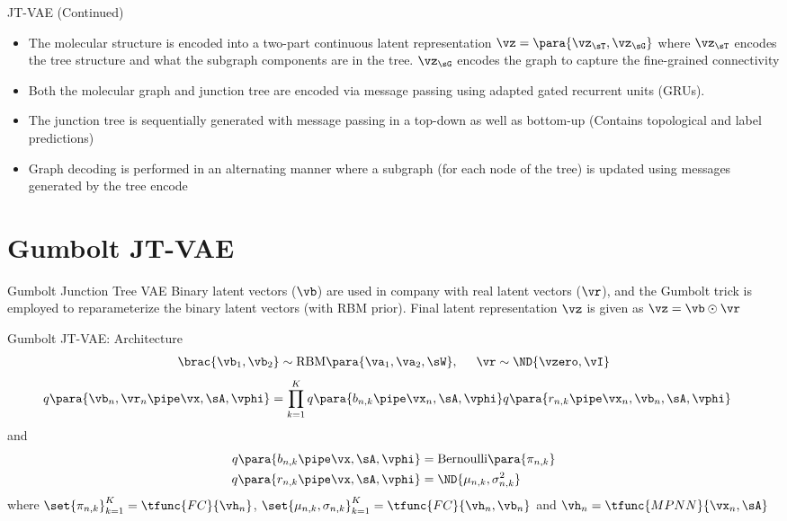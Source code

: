 \documentclass[9pt]{beamer}
\newcommand{\qp}{q\para}
\begin{document}
\begin{frame}{JT-VAE (Continued)}
	\begin{itemize}
		\item <1-> The molecular structure is encoded into a two-part continuous latent representation $\vz = \para{\vz_\sT, \vz_\sG}$ where $\vz_\sT$ encodes the tree structure and what the subgraph components are in the tree. $\vz_\sG$ encodes the graph to capture the fine-grained connectivity
		\item <2-> Both the molecular graph and junction tree are encoded via message passing using adapted gated recurrent units (GRUs).
		\item <3-> The junction tree is sequentially generated with message passing in a top-down as well as bottom-up (Contains topological and label predictions)
		\item <4-> Graph decoding is performed in an alternating manner where a subgraph (for each node of the tree) is updated using messages generated by the tree encode
	\end{itemize}
\end{frame}

\section{Gumbolt JT-VAE}
\begin{frame}{Gumbolt Junction Tree VAE}
	Binary latent vectors ($\vb$) are used in company with real latent vectors ($\vr$), and the Gumbolt trick is employed to reparameterize the binary latent vectors (with RBM prior). Final latent representation $\vz$ is given as $\vz = \vb \odot \vr$
\end{frame}

\begin{frame}{Gumbolt JT-VAE: Architecture}
	\begin{align*}
		\brac{\vb_1, \vb_2} \sim \text{RBM}\para{\va_1, \va_2, \sW}, \hspace{0.5cm} \vr \sim \ND{\vzero, \vI}
	\end{align*}
	\begin{align*}
		\qp{\vb_n, \vr_n \pipe \vx, \sA, \vphi} &= \prod_{k = 1}^K \qp{b_{n,k} \pipe \vx_n, \sA, \vphi} \qp{r_{n,k} \pipe \vx_n, \vb_n, \sA, \vphi}
	\end{align*}
	and
	\begin{align*}
		\qp{b_{n, k} \pipe \vx, \sA, \vphi} &= \text{Bernoulli}\para{\pi_{n, k}} \\
		\qp{r_{n, k} \pipe \vx, \sA, \vphi} &= \ND{\mu_{n, k}, \sigma_{n, k}^2}
	\end{align*}
	where $\set{\pi_{n, k}}_{k = 1}^K = \tfunc{FC}{\vh_n}$, $\set{\mu_{n, k}, \sigma_{n, k}}_{k = 1}^K = \tfunc{FC}{\vh_n, \vb_n}$ and $\vh_n = \tfunc{MPNN}{\vx_n, \sA}$
\end{frame}
\end{document}
